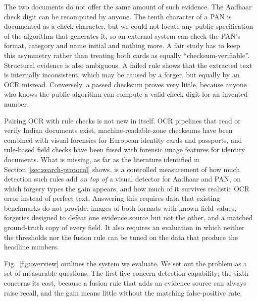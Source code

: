 \documentclass[VANCOUVER,Times1COL]{WileyNJDv5}
\begin{document}
The two documents do not offer the same amount of such evidence. The
Aadhaar check digit can be recomputed by anyone. The tenth character of
a PAN is documented as a check character, but we could not locate any
public specification of the algorithm that generates it, so an external
system can check the PAN's format, category and name initial and
nothing more. A fair study has to keep
this asymmetry rather than treating both cards as equally
``checksum-verifiable''. Structural evidence is also ambiguous. A
failed rule shows that the extracted text is internally inconsistent,
which may be caused by a forger, but equally by an OCR misread.
Conversely, a passed checksum proves very little, because anyone who
knows the public algorithm can compute a valid check digit for an
invented number.

Pairing OCR with rule checks is not new in itself.
OCR pipelines that read or verify Indian documents
exist\cite{raghuvanshi,panens}, machine-readable-zone checksums have
been combined with visual forensics for European identity cards and
passports\cite{dai}, and rule-based field checks have been fused with
forensic image features for identity documents\cite{limconnie}. What is
missing, as far as the literature identified in
Section~\ref{sec:search-protocol} shows, is a controlled measurement of
how much detection such rules add \emph{on top of} a visual detector for
Aadhaar and PAN, on which forgery types the gain appears, and how much
of it survives realistic OCR error instead of perfect text. Answering
this requires data that existing benchmarks do not provide: images of
both formats with known field values, forgeries designed to defeat one
evidence source but not the other, and a matched ground-truth copy of
every field. It also requires an evaluation in which neither the
thresholds nor the fusion rule can be tuned on the data that produce
the headline numbers.

Fig.~\ref{fig:overview} outlines the system we evaluate. We set out
the problem as a set of measurable questions. The
first five concern detection capability; the sixth concerns its cost,
because a fusion rule that adds an evidence source can always raise
recall, and the gain means little without the matching false-positive
rate.
\end{document}
